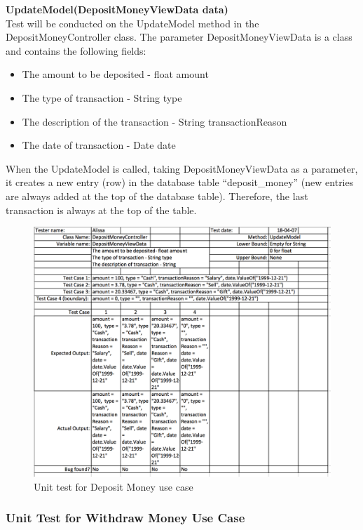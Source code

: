 \documentclass[12pt]{article}
\begin{document}
{\bf UpdateModel(DepositMoneyViewData data)}\\
Test will be conducted on the UpdateModel method in the DepositMoneyController class. The parameter DepositMoneyViewData is a class and contains the following fields:
\begin{itemize}
  \item The amount to be deposited - float amount
  \item The type of transaction - String type
  \item The description of the transaction - String transactionReason
  \item The date of transaction - Date date
\end{itemize}
When the UpdateModel is called, taking DepositMoneyViewData as a parameter, it creates a new entry (row) in the database table ``deposit\_money'' (new entries are always added at the top of the database table). Therefore, the last transaction is always at the top of the table.

\begin{figure}[H]
  \centering
  \includegraphics[width=\textwidth]{unit_test_deposit.png}
  \caption{Unit test for Deposit Money use case}
\end{figure}

\subsubsection{Unit Test for Withdraw Money Use Case}
\end{document}
